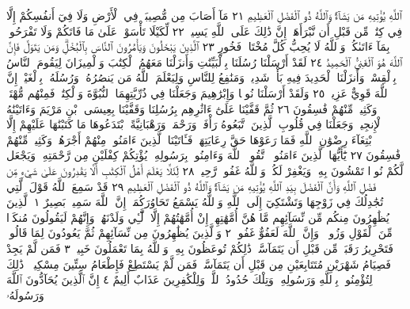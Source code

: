 ٱللَّهِ يُؤْتِيهِ مَن يَشَآءُۚ وَٱللَّهُ ذُو ٱلْفَضْلِ ٱلْعَظِيمِ ٢١ مَآ أَصَابَ
مِن مُّصِيبَةࣲ فِي ٱلْأَرْضِ وَلَا فِيٓ أَنفُسِكُمْ إِلَّا فِي كِتَٰبࣲ مِّن
قَبْلِ أَن نَّبْرَأَهَآۚ إِنَّ ذَٰلِكَ عَلَى ٱللَّهِ يَسِيرࣱ ٢٢ لِّكَيْلَا
تَأْسَوْا۟ عَلَىٰ مَا فَاتَكُمْ وَلَا تَفْرَحُوا۟ بِمَآ ءَاتَىٰكُمْۗ وَٱللَّهُ
لَا يُحِبُّ كُلَّ مُخْتَالࣲ فَخُورٍ ٢٣ ٱلَّذِينَ يَبْخَلُونَ وَيَأْمُرُونَ
ٱلنَّاسَ بِٱلْبُخْلِۗ وَمَن يَتَوَلَّ فَإِنَّ ٱللَّهَ هُوَ ٱلْغَنِيُّ ٱلْحَمِيدُ ٢٤
لَقَدْ أَرْسَلْنَا رُسُلَنَا بِٱلْبَيِّنَٰتِ وَأَنزَلْنَا مَعَهُمُ ٱلْكِتَٰبَ
وَٱلْمِيزَانَ لِيَقُومَ ٱلنَّاسُ بِٱلْقِسْطِۖ وَأَنزَلْنَا ٱلْحَدِيدَ فِيهِ
بَأْسࣱ شَدِيدࣱ وَمَنَٰفِعُ لِلنَّاسِ وَلِيَعْلَمَ ٱللَّهُ مَن يَنصُرُهُۥ وَرُسُلَهُۥ
بِٱلْغَيْبِۚ إِنَّ ٱللَّهَ قَوِيٌّ عَزِيزࣱ ٢٥ وَلَقَدْ أَرْسَلْنَا نُوحࣰا وَإِبْرَٰهِيمَ
وَجَعَلْنَا فِي ذُرِّيَّتِهِمَا ٱلنُّبُوَّةَ وَٱلْكِتَٰبَۖ فَمِنْهُم مُّهْتَدࣲۖ
وَكَثِيرࣱ مِّنْهُمْ فَٰسِقُونَ ٢٦ ثُمَّ قَفَّيْنَا عَلَىٰٓ ءَاثَٰرِهِم
بِرُسُلِنَا وَقَفَّيْنَا بِعِيسَى ٱبْنِ مَرْيَمَ وَءَاتَيْنَٰهُ ٱلْإِنجِيلَۖ وَجَعَلْنَا
فِي قُلُوبِ ٱلَّذِينَ ٱتَّبَعُوهُ رَأْفَةࣰ وَرَحْمَةࣰۚ وَرَهْبَانِيَّةً
ٱبْتَدَعُوهَا مَا كَتَبْنَٰهَا عَلَيْهِمْ إِلَّا ٱبْتِغَآءَ رِضْوَٰنِ ٱللَّهِ
فَمَا رَعَوْهَا حَقَّ رِعَايَتِهَاۖ فَـَٔاتَيْنَا ٱلَّذِينَ ءَامَنُوا۟ مِنْهُمْ أَجْرَهُمْۖ
وَكَثِيرࣱ مِّنْهُمْ فَٰسِقُونَ ٢٧ يَٰٓأَيُّهَا ٱلَّذِينَ ءَامَنُوا۟ ٱتَّقُوا۟ ٱللَّهَ
وَءَامِنُوا۟ بِرَسُولِهِۦ يُؤْتِكُمْ كِفْلَيْنِ مِن رَّحْمَتِهِۦ وَيَجْعَل لَّكُمْ نُورࣰا
تَمْشُونَ بِهِۦ وَيَغْفِرْ لَكُمْۚ وَٱللَّهُ غَفُورࣱ رَّحِيمࣱ ٢٨ لِّئَلَّا يَعْلَمَ
أَهْلُ ٱلْكِتَٰبِ أَلَّا يَقْدِرُونَ عَلَىٰ شَيْءࣲ مِّن فَضْلِ ٱللَّهِ وَأَنَّ
ٱلْفَضْلَ بِيَدِ ٱللَّهِ يُؤْتِيهِ مَن يَشَآءُۚ وَٱللَّهُ ذُو ٱلْفَضْلِ ٱلْعَظِيمِ ٢٩
قَدْ سَمِعَ ٱللَّهُ قَوْلَ ٱلَّتِي تُجَٰدِلُكَ فِي زَوْجِهَا وَتَشْتَكِيٓ إِلَى ٱللَّهِ
وَٱللَّهُ يَسْمَعُ تَحَاوُرَكُمَآۚ إِنَّ ٱللَّهَ سَمِيعُۢ بَصِيرٌ ١ ٱلَّذِينَ يُظَٰهِرُونَ
مِنكُم مِّن نِّسَآئِهِم مَّا هُنَّ أُمَّهَٰتِهِمْۖ إِنْ أُمَّهَٰتُهُمْ إِلَّا ٱلَّٰٓـِٔي
وَلَدْنَهُمْۚ وَإِنَّهُمْ لَيَقُولُونَ مُنكَرࣰا مِّنَ ٱلْقَوْلِ وَزُورࣰاۚ وَإِنَّ
ٱللَّهَ لَعَفُوٌّ غَفُورࣱ ٢ وَٱلَّذِينَ يُظَٰهِرُونَ مِن نِّسَآئِهِمْ ثُمَّ يَعُودُونَ
لِمَا قَالُوا۟ فَتَحْرِيرُ رَقَبَةࣲ مِّن قَبْلِ أَن يَتَمَآسَّاۚ ذَٰلِكُمْ تُوعَظُونَ
بِهِۦۚ وَٱللَّهُ بِمَا تَعْمَلُونَ خَبِيرࣱ ٣ فَمَن لَّمْ يَجِدْ فَصِيَامُ شَهْرَيْنِ
مُتَتَابِعَيْنِ مِن قَبْلِ أَن يَتَمَآسَّاۖ فَمَن لَّمْ يَسْتَطِعْ فَإِطْعَامُ سِتِّينَ
مِسْكِينࣰاۚ ذَٰلِكَ لِتُؤْمِنُوا۟ بِٱللَّهِ وَرَسُولِهِۦۚ وَتِلْكَ حُدُودُ ٱللَّهِۗ
وَلِلْكَٰفِرِينَ عَذَابٌ أَلِيمٌ ٤ إِنَّ ٱلَّذِينَ يُحَآدُّونَ ٱللَّهَ وَرَسُولَهُۥ
